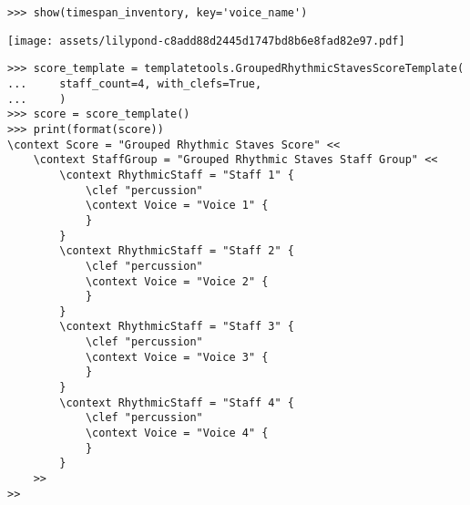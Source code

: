 \begin{comment}
<abjad>
show(timespan_inventory, key='voice_name')
score_template = templatetools.GroupedRhythmicStavesScoreTemplate(
    staff_count=4, with_clefs=True,
    )
score = score_template()
print(format(score))
</abjad>
\end{comment}

\begin{abjadbookoutput}
\begin{singlespacing}
\vspace{-0.5\baselineskip}
\begin{verbatim}
>>> show(timespan_inventory, key='voice_name')
\end{verbatim}
\noindent\texttt{[image: assets/lilypond-c8add88d2445d1747bd8b6e8fad82e97.pdf]}
\begin{verbatim}
>>> score_template = templatetools.GroupedRhythmicStavesScoreTemplate(
...     staff_count=4, with_clefs=True,
...     )
>>> score = score_template()
>>> print(format(score))
\context Score = "Grouped Rhythmic Staves Score" <<
    \context StaffGroup = "Grouped Rhythmic Staves Staff Group" <<
        \context RhythmicStaff = "Staff 1" {
            \clef "percussion"
            \context Voice = "Voice 1" {
            }
        }
        \context RhythmicStaff = "Staff 2" {
            \clef "percussion"
            \context Voice = "Voice 2" {
            }
        }
        \context RhythmicStaff = "Staff 3" {
            \clef "percussion"
            \context Voice = "Voice 3" {
            }
        }
        \context RhythmicStaff = "Staff 4" {
            \clef "percussion"
            \context Voice = "Voice 4" {
            }
        }
    >>
>>
\end{verbatim}
\end{singlespacing}
\end{abjadbookoutput}

